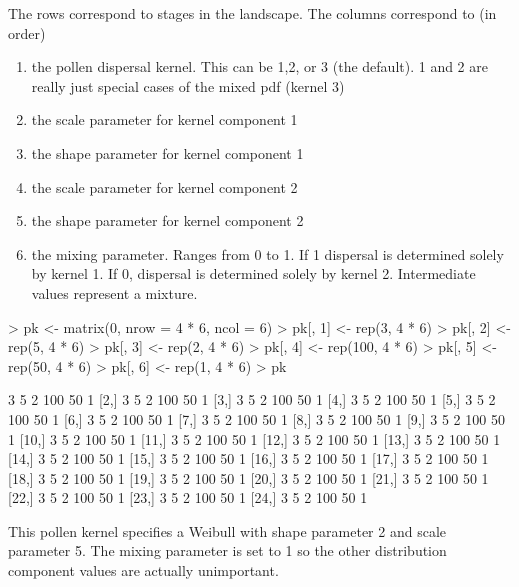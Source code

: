 \documentclass[10pt]{article}
\begin{document}
The rows correspond to stages in the landscape.  The columns correspond to (in order)
\begin{enumerate}
\item the pollen dispersal kernel.  This can be 1,2, or 3 (the default).
  1 and 2 are really just special cases of the mixed pdf (kernel 3)
\item the scale parameter for kernel component 1
\item the shape parameter for kernel component 1
\item the scale parameter for kernel component 2
\item the shape parameter for kernel component 2
\item the mixing parameter.  Ranges from 0 to 1.  If 1 dispersal is
  determined solely by kernel 1.  If 0, dispersal is determined solely
  by kernel 2.  Intermediate values represent a mixture.
\end{enumerate}
\begin{Schunk}
\begin{Sinput}
> pk <- matrix(0, nrow = 4 * 6, ncol = 6)
> pk[, 1] <- rep(3, 4 * 6)
> pk[, 2] <- rep(5, 4 * 6)
> pk[, 3] <- rep(2, 4 * 6)
> pk[, 4] <- rep(100, 4 * 6)
> pk[, 5] <- rep(50, 4 * 6)
> pk[, 6] <- rep(1, 4 * 6)
> pk
\end{Sinput}
\begin{Soutput}
      [,1] [,2] [,3] [,4] [,5] [,6]
 [1,]    3    5    2  100   50    1
 [2,]    3    5    2  100   50    1
 [3,]    3    5    2  100   50    1
 [4,]    3    5    2  100   50    1
 [5,]    3    5    2  100   50    1
 [6,]    3    5    2  100   50    1
 [7,]    3    5    2  100   50    1
 [8,]    3    5    2  100   50    1
 [9,]    3    5    2  100   50    1
[10,]    3    5    2  100   50    1
[11,]    3    5    2  100   50    1
[12,]    3    5    2  100   50    1
[13,]    3    5    2  100   50    1
[14,]    3    5    2  100   50    1
[15,]    3    5    2  100   50    1
[16,]    3    5    2  100   50    1
[17,]    3    5    2  100   50    1
[18,]    3    5    2  100   50    1
[19,]    3    5    2  100   50    1
[20,]    3    5    2  100   50    1
[21,]    3    5    2  100   50    1
[22,]    3    5    2  100   50    1
[23,]    3    5    2  100   50    1
[24,]    3    5    2  100   50    1
\end{Soutput}
\end{Schunk}
This pollen kernel specifies a Weibull with shape parameter 2 and
scale parameter 5.  The mixing parameter is set to 1 so the other
distribution component values are actually unimportant.
\end{document}
